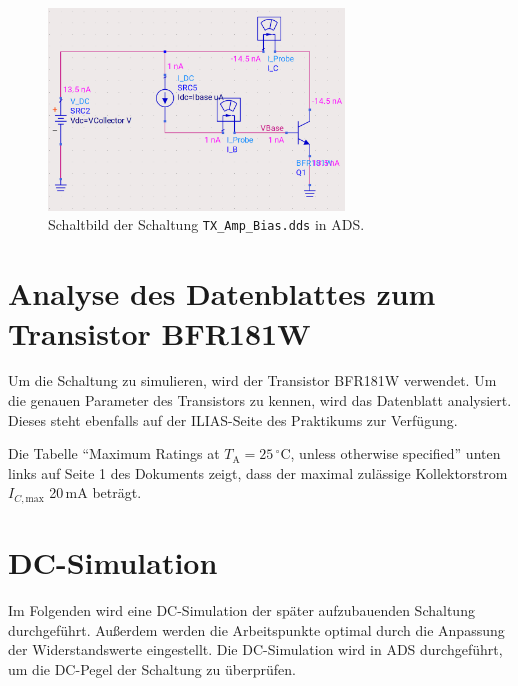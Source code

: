 \begin{figure}[h]
    \centering
    \includegraphics[width=0.7\textwidth]{Pictures/TX_BIAS.png}
    \caption{Schaltbild der Schaltung \texttt{TX\_Amp\_Bias.dds} in \ac{ADS}.}
    \label{fig:TX_BIAS}
\end{figure}

\section{Analyse des Datenblattes zum Transistor BFR181W}
Um die Schaltung zu simulieren, wird der Transistor BFR181W verwendet. Um die genauen Parameter des Transistors zu kennen, wird das Datenblatt analysiert.
Dieses steht ebenfalls auf der ILIAS-Seite des Praktikums zur Verfügung.

Die Tabelle \enquote{Maximum Ratings at $T_\mathrm{A}=25\,^\circ\mathrm{C}$, unless otherwise specified} unten links auf Seite 1 des Dokuments zeigt, dass der maximal zulässige Kollektorstrom $I_{C,\mathrm{max}}$ 20\,mA beträgt.

\section{DC-Simulation}
Im Folgenden wird eine DC-Simulation der später aufzubauenden Schaltung durchgeführt. 
Außerdem werden die Arbeitspunkte optimal durch die Anpassung der Widerstandswerte eingestellt.
Die DC-Simulation wird in \ac{ADS} durchgeführt, um die DC-Pegel der Schaltung zu überprüfen.
\clearpage

